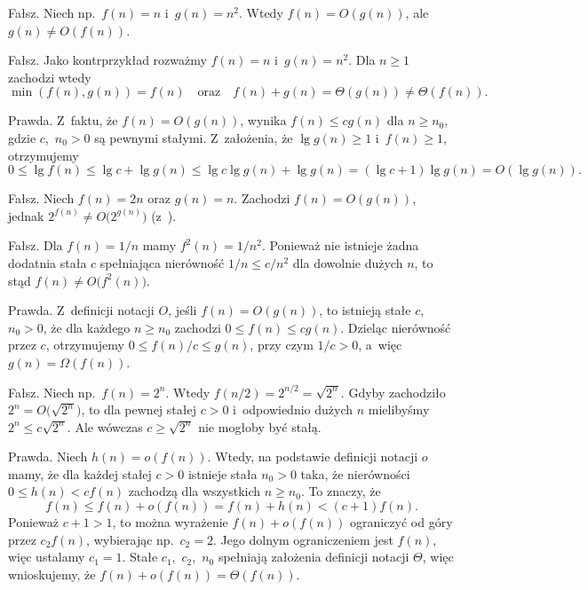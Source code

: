 
\subproblem %
Fałsz. Niech np.\ $f(n)=n$ i~$g(n)=n^2$. Wtedy $f(n)=O(g(n))$, ale $g(n)\ne O(f(n))$.

\subproblem %
Fałsz. Jako kontrprzykład rozważmy $f(n)=n$ i~$g(n)=n^2$. Dla $n\ge1$ zachodzi wtedy
\[
	\min(f(n),g(n)) = f(n) \quad\text{oraz}\quad f(n)+g(n) = \Theta(g(n)) \ne \Theta(f(n)).
\]

\subproblem %
Prawda. Z~faktu, że $f(n)=O(g(n))$, wynika $f(n)\le cg(n)$ dla $n\ge n_0$, gdzie $c$,~$n_0>0$ są pewnymi stałymi. Z~założenia, że $\lg g(n)\ge1$ i~$f(n)\ge1$, otrzymujemy
\[
	0 \le \lg f(n) \le \lg c+\lg g(n) \le \lg c\lg g(n)+\lg g(n) = (\lg c+1)\lg g(n) = O(\lg g(n)).
\]

\subproblem %
Fałsz. Niech $f(n)=2n$ oraz $g(n)=n$. Zachodzi $f(n)=O(g(n))$, jednak $2^{f(n)}\ne O\bigl(2^{g(n)}\bigr)$ (z~).

\subproblem %
Fałsz. Dla $f(n)=1/n$ mamy $f^2(n)=1/n^2$. Ponieważ nie istnieje żadna dodatnia stała $c$ spełniająca nierówność $1/n\le c/n^2$ dla dowolnie dużych $n$, to stąd $f(n)\ne O\bigl(f^2(n)\bigr)$.

\subproblem %
Prawda. Z~definicji notacji $O$, jeśli $f(n)=O(g(n))$, to istnieją stałe $c$,~$n_0>0$, że dla każdego $n\ge n_0$ zachodzi $0\le f(n)\le cg(n)$. Dzieląc nierówność przez $c$, otrzymujemy $0\le f(n)/c\le g(n)$, przy czym $1/c>0$, a~więc $g(n)=\Omega(f(n))$.

\subproblem %
Fałsz. Niech np.\ $f(n)=2^n$. Wtedy $f(n/2)=2^{n/2}=\sqrt{2^n}$. Gdyby zachodziło $2^n=O\bigl(\!\sqrt{2^n}\bigr)$, to dla pewnej stałej $c>0$ i~odpowiednio dużych $n$ mielibyśmy $2^n\le c\sqrt{2^n}$. Ale wówczas $c\ge\sqrt{2^n}$ nie mogłoby być stałą.

\subproblem %
Prawda. Niech $h(n)=o(f(n))$. Wtedy, na podstawie definicji notacji $o$ mamy, że dla każdej stałej $c>0$ istnieje stała $n_0>0$ taka, że nierówności $0\le h(n)<cf(n)$ zachodzą dla wszystkich $n\ge n_0$. To znaczy, że
\[
	f(n) \le f(n)+o(f(n)) = f(n)+h(n) < (c+1)f(n).
\]
Ponieważ $c+1>1$, to można wyrażenie $f(n)+o(f(n))$ ograniczyć od góry przez $c_2f(n)$, wybierając np.\ $c_2=2$. Jego dolnym ograniczeniem jest $f(n)$, więc ustalamy $c_1=1$. Stałe $c_1$,~$c_2$,~$n_0$ spełniają założenia definicji notacji $\Theta$, więc wnioskujemy, że $f(n)+o(f(n))=\Theta(f(n))$.


